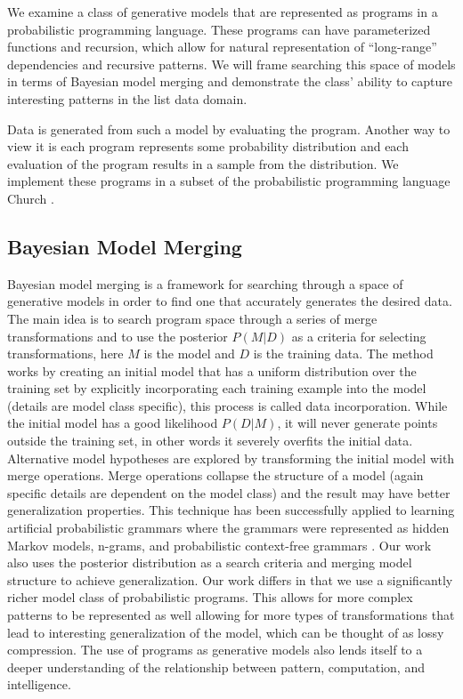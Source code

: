 \documentclass[a4paper,10pt]{article}
\begin{document}
We examine a class of generative models that are represented as programs in a probabilistic programming language.  These programs can have parameterized functions and recursion, which allow for natural representation of ``long-range'' dependencies and recursive patterns.  We will frame searching this space of models in terms of Bayesian model merging \cite{Stolcke:1994:IPG:645515.658235} and demonstrate the class' ability to capture interesting patterns in the list data domain.

Data is generated from such a model by evaluating the program.  Another way to view it is each program represents some probability distribution and each 
evaluation of the program results in a sample from the distribution. We implement these programs in a subset of the probabilistic programming language Church \cite{N.D.Goodman:2008:f2a0d}.  


\subsection{Bayesian Model Merging}
Bayesian model merging is a framework for searching through a space of generative models in order to find one that accurately generates the desired data.  The main idea is to search program space through a series of merge transformations and to use the posterior $P(M|D)$ as a criteria for selecting transformations, here $M$ is the model and $D$ is the training data.  The method works by creating an initial model that has a uniform distribution over the training set by explicitly incorporating each training example into the model (details are model class specific), this process is called data incorporation.  While the initial model has a good likelihood $P(D|M)$, it will never generate points outside the training set, in other words it severely overfits the initial data.  Alternative model hypotheses are explored by transforming the initial model with merge operations.  Merge operations collapse the structure of a model (again specific details are dependent on the model class) and the result may have better generalization properties.  This technique has been successfully applied to learning artificial probabilistic grammars where the grammars were represented as hidden Markov models, n-grams, and probabilistic context-free grammars \cite{Stolcke:1994:IPG:645515.658235}.  Our work also uses the posterior distribution as a search criteria and merging model structure to achieve generalization.  Our work differs in that we use a significantly richer model class of probabilistic programs.  This allows for more complex patterns to be represented as well allowing for more types of transformations that lead to interesting generalization of the model, which can be thought of as lossy compression.   The use of programs as generative models also lends itself to a deeper understanding of the relationship between pattern, computation, and intelligence.
\end{document}
